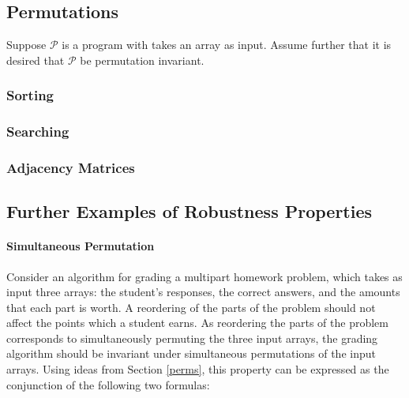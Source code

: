 \documentclass{llncs}
\begin{document}

\subsection{Permutations}

Suppose \(\mathcal{P}\) is a program with takes an array as input.  Assume further that it is desired that \(\mathcal{P}\) be permutation invariant.

\subsubsection{Sorting}




\subsubsection{Searching}


\subsubsection{Adjacency Matrices}


\subsection{Further Examples of Robustness Properties}

\paragraph{Simultaneous Permutation}
Consider an algorithm for grading a multipart homework problem, which takes as input three arrays:  the student's responses, the correct answers, and the amounts that each part is worth.  A reordering of the parts of the problem should not affect the points which a student earns.  As reordering the parts of the problem corresponds to simultaneously permuting the three input arrays, the grading algorithm should be invariant under simultaneous permutations of the input arrays.  Using ideas from Section \ref{perms}, this property can be expressed as the conjunction of the following two formulas:
\end{document}
